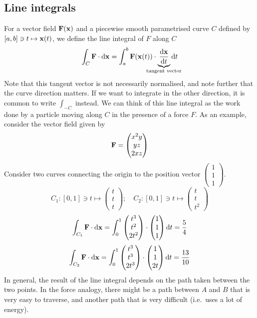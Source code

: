 \subsection{Line integrals}
For a vector field \(\vb F(\vb x)\) and a piecewise smooth parametrised curve \(C\) defined by \([a, b] \ni t \mapsto \vb x(t)\), we define the line integral of \(F\) along \(C\)
\[
	\int_C \vb F \cdot \dd \vb x = \int_a^b \vb F(\vb x(t)) \cdot \underbrace{\frac{\dd \vb x}{\dd{t}}}_{\mathclap{\text{tangent vector}}} \dd{t}
\]
Note that this tangent vector is not necessarily normalised, and note further that the curve direction matters.
If we want to integrate in the other direction, it is common to write \(\int_{-C}\) instead.
We can think of this line integral as the work done by a particle moving along \(C\) in the presence of a force \(F\).
As an example, consider the vector field given by
\[
	\vb F = \begin{pmatrix}
		x^2 y \\ yz \\ 2xz
	\end{pmatrix}
\]
Consider two curves connecting the origin to the position vector \(\begin{pmatrix}
	1 \\ 1 \\ 1
\end{pmatrix}\).
\[
	C_1 \colon [0, 1] \ni t \mapsto \begin{pmatrix}
		t \\ t \\ t
	\end{pmatrix};\quad C_2 \colon [0, 1] \ni t \mapsto \begin{pmatrix}
		t \\ t \\ t^2
	\end{pmatrix}
\]
\[
	\int_{C_1}\vb F \cdot \dd \vb x = \int_0^1 \begin{pmatrix}
		t^3 \\ t^2 \\ 2t^2
	\end{pmatrix} \cdot \begin{pmatrix}
		1 \\ 1 \\ 1
	\end{pmatrix} \dd{t} = \frac{5}{4}
\]
\[
	\int_{C_2}\vb F \cdot \dd \vb x = \int_0^1 \begin{pmatrix}
		t^3 \\ t^3 \\ 2t^3
	\end{pmatrix} \cdot \begin{pmatrix}
		1 \\ 1 \\ 2t
	\end{pmatrix} \dd{t} = \frac{13}{10}
\]
In general, the result of the line integral depends on the path taken between the two points.
In the force analogy, there might be a path between \(A\) and \(B\) that is very easy to traverse, and another path that is very difficult (i.e.\ uses a lot of energy).

